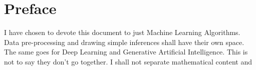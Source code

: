 \documentclass[a4paper,10pt]{article}
\title{}
\author{}
\begin{document}
\maketitle

\begin{abstract}

\end{abstract}

\section{Preface}

I have chosen to devote this document to just Machine Learning Algorithms. Data pre-processing and drawing simple inferences shall have their own space. The same goes for Deep Learning and Generative Artificial Intelligence. This is not to say they don't go together.
I shall not separate mathematical content and 
\end{document}

